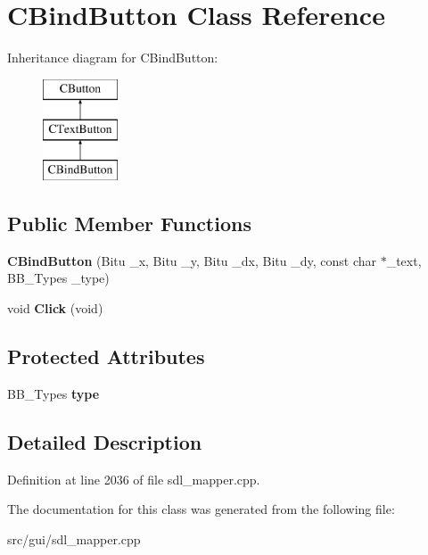 \hypertarget{classCBindButton}{\section{C\-Bind\-Button Class Reference}
\label{classCBindButton}
}
Inheritance diagram for C\-Bind\-Button\-:\begin{figure}[H]
\begin{center}
\leavevmode
\includegraphics[height=3.000000cm]{classCBindButton}
\end{center}
\end{figure}
\subsection*{Public Member Functions}
\begin{DoxyCompactItemize}
\item 
\hypertarget{classCBindButton_ac88961b71a1666452f4d848f851259d9}{{\bfseries C\-Bind\-Button} (Bitu \-\_\-x, Bitu \-\_\-y, Bitu \-\_\-dx, Bitu \-\_\-dy, const char $\ast$\-\_\-text, B\-B\-\_\-\-Types \-\_\-type)}\label{classCBindButton_ac88961b71a1666452f4d848f851259d9}

\item 
\hypertarget{classCBindButton_a62e84c58b256b4b9f82d6ad1ca32be45}{void {\bfseries Click} (void)}\label{classCBindButton_a62e84c58b256b4b9f82d6ad1ca32be45}

\end{DoxyCompactItemize}
\subsection*{Protected Attributes}
\begin{DoxyCompactItemize}
\item 
\hypertarget{classCBindButton_a6d3fe3711c3f57f5e2ec7a2311408795}{B\-B\-\_\-\-Types {\bfseries type}}\label{classCBindButton_a6d3fe3711c3f57f5e2ec7a2311408795}

\end{DoxyCompactItemize}


\subsection{Detailed Description}


Definition at line 2036 of file sdl\-\_\-mapper.\-cpp.



The documentation for this class was generated from the following file\-:\begin{DoxyCompactItemize}
\item 
src/gui/sdl\-\_\-mapper.\-cpp\end{DoxyCompactItemize}
